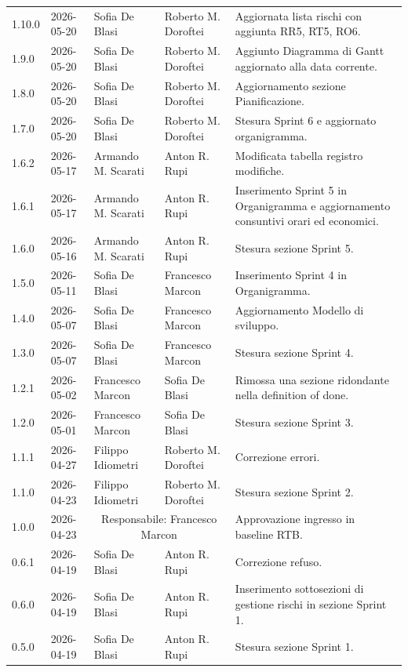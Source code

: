 \begin{longtable}{>{\ttfamily\small}l l l l >{\raggedright\arraybackslash}p{4cm}}
	1.10.0 & 2026-05-20 & Sofia De Blasi & Roberto M. Doroftei & Aggiornata lista rischi con aggiunta RR5, RT5, RO6. \\
	1.9.0 & 2026-05-20 & Sofia De Blasi & Roberto M. Doroftei & Aggiunto Diagramma di Gantt aggiornato alla data corrente. \\
	1.8.0 & 2026-05-20 & Sofia De Blasi & Roberto M. Doroftei & Aggiornamento sezione Pianificazione. \\
	1.7.0 & 2026-05-20 & Sofia De Blasi & Roberto M. Doroftei & Stesura Sprint 6 e aggiornato organigramma. \\
	1.6.2 & 2026-05-17 & Armando M. Scarati & Anton R. Rupi & Modificata tabella registro modifiche. \\
    1.6.1 & 2026-05-17 & Armando M. Scarati & Anton R. Rupi & Inserimento Sprint 5 in Organigramma e aggiornamento consuntivi orari ed economici. \\
    1.6.0 & 2026-05-16 & Armando M. Scarati & Anton R. Rupi & Stesura sezione Sprint 5. \\
    1.5.0 & 2026-05-11 & Sofia De Blasi & Francesco Marcon & Inserimento Sprint 4 in Organigramma. \\
    1.4.0 & 2026-05-07 & Sofia De Blasi & Francesco Marcon & Aggiornamento Modello di sviluppo. \\
    1.3.0 & 2026-05-07 & Sofia De Blasi & Francesco Marcon & Stesura sezione Sprint 4. \\
    1.2.1 & 2026-05-02 & {Francesco Marcon} & {Sofia De Blasi} & Rimossa una sezione ridondante nella definition of done. \\
    1.2.0 & 2026-05-01 & {Francesco Marcon} & {Sofia De Blasi} & Stesura sezione Sprint 3. \\
    1.1.1 & 2026-04-27 & {Filippo Idiometri} & {Roberto M. Doroftei} & Correzione errori. \\
    1.1.0 & 2026-04-23 & {Filippo Idiometri} & {Roberto M. Doroftei} & Stesura sezione Sprint 2. \\
    1.0.0 & 2026-04-23 & \multicolumn{2}{c}{Responsabile: Francesco Marcon} & Approvazione ingresso in baseline RTB. \\
    0.6.1 & 2026-04-19 & {Sofia De Blasi} & {Anton R. Rupi} & Correzione refuso. \\
    0.6.0 & 2026-04-19 & {Sofia De Blasi} & {Anton R. Rupi} & Inserimento sottosezioni di gestione rischi in sezione Sprint 1. \\
    0.5.0 & 2026-04-19 & {Sofia De Blasi} & {Anton R. Rupi} & Stesura sezione Sprint 1. \\

\end{longtable}
